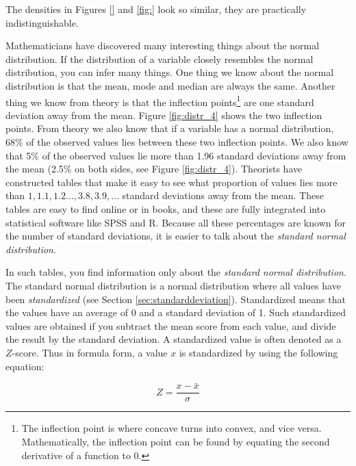 \documentclass[]{report}\usepackage[]{graphicx}\usepackage[]{color}
\begin{document}
The densities in Figures \ref{} and \ref{fig:} look so similar, they are practically indistinguishable.

Mathematicians have discovered many interesting things about the normal distribution. If the distribution of a variable closely resembles the normal distribution, you can infer many things. One thing we know about the normal distribution is that the mean, mode and median are always the same. Another thing we know from theory is that the inflection points\footnote{The inflection point is where concave turns into convex, and vice versa. Mathematically, the inflection point can be found by equating the second derivative of a function to 0.} are one standard deviation away from the mean.  Figure \ref{fig:distr_4} shows the two inflection points. From theory we also know that if a variable has a normal distribution, 68\% of the observed values lies between these two inflection points. We also know that 5\% of the observed values lie more than 1.96 standard deviations away from the mean (2.5\% on both sides, see Figure \ref{fig:distr_4}). Theorists have constructed tables that make it easy to see what proportion of values lies more than $1, 1.1, 1.2 \dots, 3.8, 3.9, \dots$ standard deviations away from the mean. These tables are easy to find online or in books, and these are fully integrated into statistical software like SPSS and R. Because all these percentages are known for the number of standard deviations, it is easier to talk about the \textit{standard normal distribution}.

In such tables, you find information only about the \textit{standard normal distribution}. The standard normal distribution is a normal distribution where all values have been \textit{standardized} (see Section \ref{sec:standarddeviation}). Standardized means that the values have an average of 0 and a standard deviation of 1. Such standardized values are obtained if you subtract the mean score from each value, and divide the result by the standard deviation. A standardized value is often denoted as a $Z$-score. Thus in formula form, a value $x$ is standardized by using the following equation:


\begin{equation}
Z = \frac{x - \bar{x}}{\sigma}
\end{equation}
\end{document}
